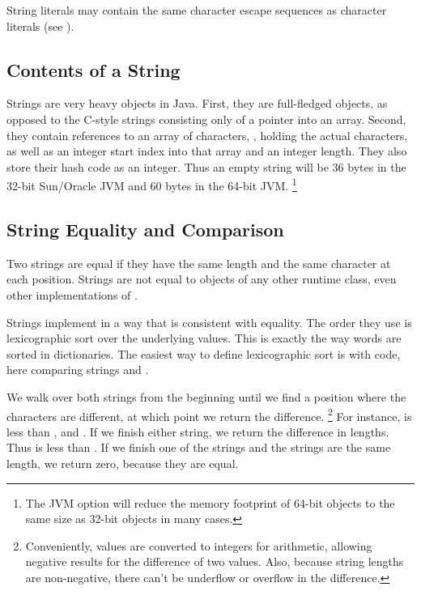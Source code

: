 String literals may contain the same character escape sequences as
character literals (see ).



\subsection{Contents of a String}

Strings are very heavy objects in Java.  First, they are full-fledged
objects, as opposed to the C-style strings consisting only of a
pointer into an array.  Second, they contain references to an array of
characters, , holding the actual characters, as well as
an integer start index into that array and an integer length.  They
also store their hash code as an integer.  Thus an empty string will
be 36 bytes in the 32-bit Sun/Oracle JVM and 60 bytes in the 64-bit
JVM.%
%
\footnote{The JVM option  will reduce
the memory footprint of 64-bit objects to the same size as 32-bit
objects in many cases.}


\subsection{String Equality and Comparison}

Two strings are equal if they have the same length and the same
character at each position.  Strings are not equal to objects of any
other runtime class, even other implementations of .

Strings implement  in a way that is
consistent with equality.  The order they use is lexicographic
sort over the underlying  values.  This is exactly the
way words are sorted in dictionaries.  The easiest way to define
lexicographic sort is with code, here comparing strings 
and .
%

We walk over both strings from the beginning until we find a position
where the characters are different, at which point we return the
difference.%
%
\footnote{Conveniently,  values are converted to integers
  for arithmetic, allowing negative results for the difference of two
  values.  Also, because string lengths are non-negative, there can't
  be underflow or overflow in the difference.}
%
For instance,  is less than 
, and .  If we finish either string, we
return the difference in lengths.  Thus  is less than
.  If we finish one of the strings and the strings are
the same length, we return zero, because they are equal.

